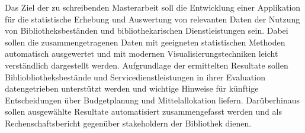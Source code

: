 Das Ziel der zu schreibenden Masterarbeit soll die Entwicklung einer 
Applikation für die statistische Erhebung und Auswertung von
relevanten Daten der Nutzung von Bibliotheksbeständen und bibliothekarischen Dienstleistungen
sein. Dabei sollen die zusammengetragenen Daten mit geeigneten statistischen Methoden
automatisch ausgewertet und mit modernen Visualisierungstechniken leicht verständlich dargestellt werden.
Aufgrundlage der ermittelten Resultate sollen Bibliobliotheksbestände und
Servicedienstleistungen in ihrer Evaluation datengetrieben unterstützt werden und wichtige
Hinweise für künftige Entscheidungen über Budgetplanung und Mittelallokation liefern.
Darüberhinaus sollen ausgewählte Resultate automatisiert zusammengefasst werden
und als Rechenschaftsbericht gegenüber stakeholdern der Bibliothek dienen.






